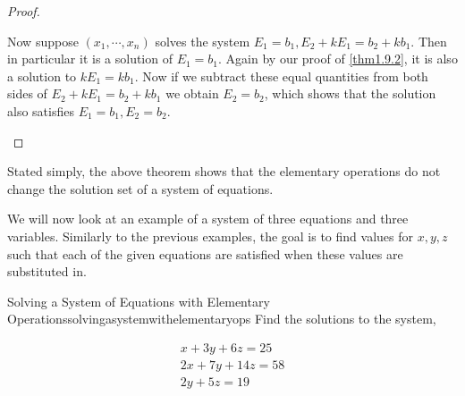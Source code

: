 \begin{proof}
\begin{enumerate}
Now suppose $\left( x_{1},\cdots ,x_{n}\right)$  solves the system 
$E_{1}=b_{1}, E_{2}+kE_{1}=b_{2}+kb_{1}$. Then in particular it is a solution of $E_{1} = b_{1}$. Again by our proof of \ref{thm1.9.2},
 it is also a solution to $kE_{1}=kb_{1}$. Now if we subtract these equal quantities from both sides of 
$E_{2}+kE_{1}=b_{2}+kb_{1}$ we obtain $E_{2}=b_{2}$, which shows that the solution also satisfies
$E_{1}=b_{1},E_{2}=b_{2}.$ 
\end{enumerate}
\end{proof}

Stated simply, the above theorem shows that the elementary operations do not
change the solution set of a system of equations.

We will now look at an example of a system of three equations and three variables.
Similarly to the previous examples, the goal is to find values for $x,y,z$ such that each of the given equations
are satisfied when these values are substituted in.

\begin{example}{ Solving a System of Equations with Elementary Operations}{solvingasystemwithelementaryops}
Find the solutions to the system,

\begin{equation}
\begin{array}{c}
x+3y+6z=25 \\
2x+7y+14z=58 \\
2y+5z=19
\end{array}
\label{solvingasystem1}
\end{equation}
\end{example}

